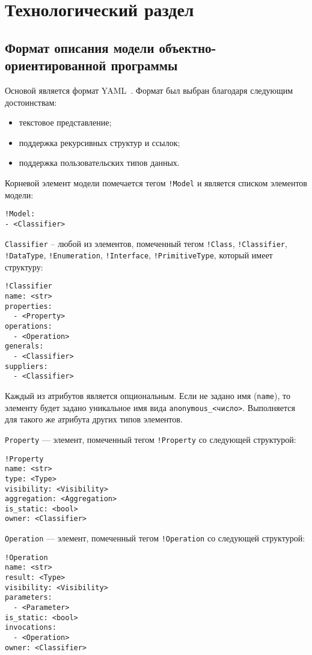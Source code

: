 \chapter{Технологический раздел}
\label{cha:implementation}

\section{Формат описания модели объектно-ориентированной программы}

Основой является формат YAML~\cite{YAML}.
Формат был выбран благодаря следующим достоинствам:
\begin{itemize}
\item текстовое представление;
\item поддержка рекурсивных структур и ссылок;
\item поддержка пользовательских типов данных.
\end{itemize}

Корневой элемент модели помечается тегом \verb;!Model; и является списком элементов
модели:
\begin{verbatim}
!Model:
- <Classifier>
\end{verbatim}

\verb;Classifier; -- любой из элементов, помеченный тегом \verb;!Class;,
\verb;!Classifier;, \verb;!DataType;, \verb;!Enumeration;, \verb;!Interface;,
\verb;!PrimitiveType;, который имеет структуру:
\begin{verbatim}
!Classifier
name: <str>
properties:
  - <Property>
operations:
  - <Operation>
generals:
  - <Classifier>
suppliers:
  - <Classifier>
\end{verbatim}

Каждый из атрибутов является опциональным.
Если не задано имя (\verb;name;), то элементу будет задано уникальное
имя вида \verb;anonymous_<число>;.
Выполняется для такого же атрибута других типов элементов.

\verb;Property; --- элемент, помеченный тегом \verb;!Property; со следующей
структурой:
\begin{verbatim}
!Property
name: <str>
type: <Type>
visibility: <Visibility>
aggregation: <Aggregation>
is_static: <bool>
owner: <Classifier>
\end{verbatim}

\verb;Operation; --- элемент, помеченный тегом \verb;!Operation; со следующей
структурой:
\begin{verbatim}
!Operation
name: <str>
result: <Type>
visibility: <Visibility>
parameters:
  - <Parameter>
is_static: <bool>
invocations:
  - <Operation>
owner: <Classifier>
\end{verbatim}

